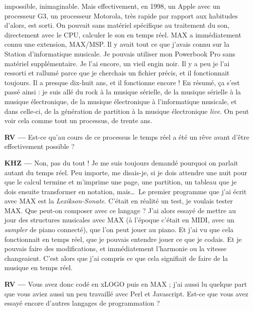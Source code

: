 \documentclass[a4paper,12pt]{article}
\begin{document}
impossible, inimaginable. Mais effectivement, en 1998, un Apple avec un processeur G3, un processeur Motorola, très rapide par rapport aux habitudes d'alors, est sorti. On pouvait sans matériel spécifique au traitement du son, directement avec le CPU, calculer le son en temps réel. MAX a immédiatement connu une extension, MAX/MSP. Il y avait tout ce que j'avais connu sur la Station d'informatique musicale. Je pouvais utiliser mon Powerbook Pro sans matériel supplémentaire. Je l'ai encore, un vieil engin noir. Il y a peu je l'ai ressorti et rallumé parce que je cherchais un fichier précis, et il fonctionnait toujours. Il a presque dix-huit ans, et il fonctionne encore ! En résumé, ça s'est passé ainsi : je suis allé du rock à la musique sérielle, de la musique sérielle à la musique électronique, de la musique électronique à l'informatique musicale, et dans celle-ci, de la génération de partition à la musique électronique \emph{live}. On peut voir cela comme tout un processus, de trente ans.

\textbf{RV ---} Est-ce qu'au cours de ce processus le temps réel a été un rêve avant d'être effectivement possible ?

\textbf{KHZ ---} Non, pas du tout ! Je me suis toujours demandé pourquoi on parlait autant du temps réel. Peu importe, me disais-je, si je dois attendre une nuit pour que le calcul termine et m'imprime une page, une partition, un tableau que je dois ensuite transformer en notation, mais\dots~Le premier programme que j'ai écrit avec MAX est la \emph{Lexikson-Sonate}. C'était en réalité un test, je voulais tester MAX. Que peut-on composer avec ce langage ? J'ai alors essayé de mettre au jour des structures musicales avec MAX (à l'époque c'était en MIDI, avec un \emph{sampler} de piano connecté), que l'on peut jouer au piano. Et j'ai vu que cela fonctionnait en temps réel, que je pouvais entendre jouer ce que je codais. Et je pouvais faire des modifications, et immédiatement l'harmonie ou la vitesse changeaient. C'est alors que j'ai compris ce que cela signifiait de faire de la musique en temps réel.

\textbf{RV ---} Vous avez donc codé en xLOGO puis en MAX ; j'ai aussi lu quelque part que vous aviez aussi un peu travaillé avec Perl et Javascript. Est-ce que vous avez essayé encore d'autres langages de programmation ?
\end{document}
